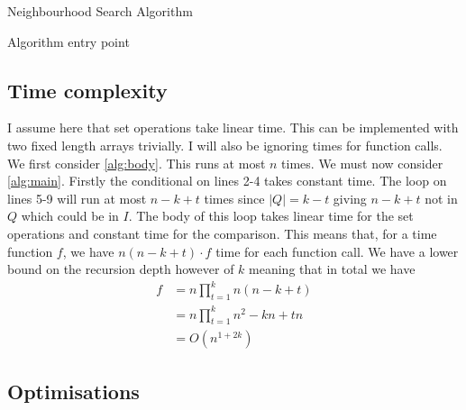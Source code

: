 \documentclass[11pt]{article}
\begin{document}
\begin{algorithm}
\caption{Neighbourhood Search Algorithm}\label{alg:main}
\end{algorithm}

\begin{algorithm}
\caption{Algorithm entry point}\label{alg:body}
\end{algorithm}

\subsection{Time complexity}

I assume here that set operations take linear time. This can be implemented with two fixed length arrays trivially. I will also be ignoring times for function calls.\\

We first consider \cref{alg:body}. This runs at most $n$ times. We must now consider \cref{alg:main}. Firstly the conditional on lines 2-4 takes constant time. The loop on lines 5-9 will run at most $n-k+t$ times since $|Q|=k-t$ giving $n-k+t$ not in $Q$ which could be in $I$. The body of this loop takes linear time for the set operations and constant time for the comparison. This means that, for a time function $f$, we have $n(n-k+t)\cdot f$ time for each function call. We have a lower bound on the recursion depth however of $k$ meaning that in total we have
\begin{equation}
	\begin{aligned}
		f &= n\prod_{t=1}^kn(n-k+t)\\
		&=n\prod_{t=1}^kn^2-kn+tn\\
		&=O(n^{1+2k})
	\end{aligned}
\end{equation}

\subsection{Optimisations}
\label{subsec:optimisations}
\end{document}
